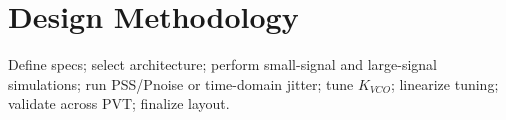 \chapter{Design Methodology}
Define specs; select architecture; perform small-signal and large-signal simulations; run PSS/Pnoise or time-domain jitter; tune \(K_{VCO}\); linearize tuning; validate across PVT; finalize layout.


